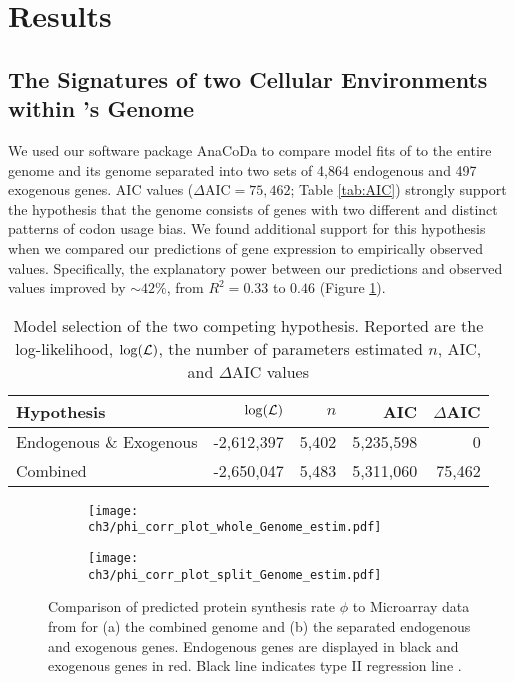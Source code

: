 \section{Results}
\subsection{The Signatures of two Cellular Environments within \kluyveri's Genome}
We used our software package AnaCoDa \citep{landerer2018} to compare model fits of \ROC to the entire \kluyveri genome and its genome separated into two sets of 4,864 endogenous and 497 exogenous genes.
AIC values ($\Delta\text{AIC} = 75,462$; Table \ref{tab:AIC}) strongly support the hypothesis that the \kluyveri genome consists of genes with two different and distinct patterns of codon usage bias.
We found additional support for this hypothesis when we compared our predictions of gene expression to empirically observed values.
Specifically, the explanatory power between our predictions and observed values improved by $\sim 42\%$, from $R^2 = 0.33$ to $0.46$ (Figure \ref{fig:phi_corr_two_cond}).

\begin{table}[h]
  \centering
  \caption{Model selection of the two competing hypothesis. Reported are the log-likelihood, $\log(\mathcal{L})$, the number of parameters estimated $n$, AIC, and $\Delta$AIC values}
  \begin{tabular}{lrrrr}
    \hline
    Hypothesis             & $\log(\mathcal{L})$ &$n$ &  AIC & $\Delta$AIC\\ \hline 
    Endogenous \& Exogenous& -2,612,397 & 5,402 & 5,235,598&      0\\
    Combined               & -2,650,047 & 5,483 & 5,311,060& 75,462\\ \hline
  \end{tabular}
  \label{tab:AIC_klu}
\end{table}
\clearpage

\begin{figure}
    \centering
    \begin{subfigure}
        \centering
        \texttt{[image: ch3/phi\_corr\_plot\_whole\_Genome\_estim.pdf]}
    \end{subfigure}
    \begin{subfigure}
        \centering
        \texttt{[image: ch3/phi\_corr\_plot\_split\_Genome\_estim.pdf]}
    \end{subfigure}
    \caption{Comparison of predicted protein synthesis rate $\phi$ to Microarray data from \citet{tsankov2010} for (a) the combined genome and (b) the separated endogenous and exogenous genes. 
    Endogenous genes are displayed in black and exogenous genes in red. Black line indicates type II regression line \cite{SokalAndRohlf1981}.}
    \label{fig:phi_corr_two_cond}
\end{figure}


